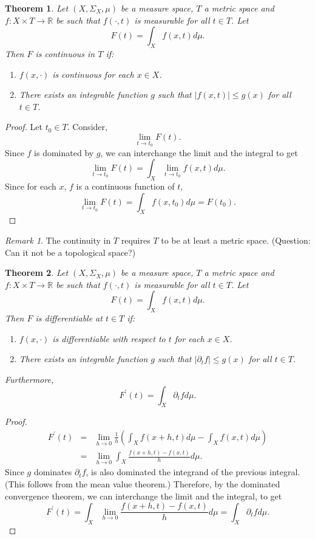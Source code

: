 \documentclass{article}
\newcommand{\sor}{\mathbb{R}}
\newcommand{\op}{\prime}
\theoremstyle{plain}
\newtheorem{thm}{Theorem}
\numberwithin{thm}{section}
\theoremstyle{plain}
\numberwithin{prop}{section}
\theoremstyle{definition}
\numberwithin{defn}{section}
\theoremstyle{remark}
\newtheorem*{rem}{Remark}
\theoremstyle{plain}
\numberwithin{cor}{section}
\numberwithin{equation}{section}
\begin{document}
\begin{thm}\label{c4t11} Let $(X, \Sigma_X, \mu)$ be a measure space, $T$ a 
metric space and $f:X \times T \rightarrow \sor$ be such that $f(\cdot, t)$ is
measurable for all $t \in T$. Let
\[
F(t) = \int_X f(x, t)d\mu.
\]
Then $F$ is continuous in $T$ if:
\begin{enumerate}
\item $f(x, \cdot)$ is continuous for each $x \in X$.
\item There exists an integrable function $g$ such that $|f(x, t)| \le g(x)$ 
for all $t \in T$.
\end{enumerate}
\end{thm}
\begin{proof}
Let $t_0 \in T$. Consider,
\[
\lim_{t \rightarrow t_0} F(t).
\]
Since $f$ is dominated by $g$, we can interchange the limit and the integral to
get
\[
\lim_{t \rightarrow t_0} F(t) = \int_X\lim_{t \rightarrow t_0}f(x, t)d\mu.
\]
Since for each $x$, $f$ is a continuous function of $t$,
\[
\lim_{t \rightarrow t_0} F(t) = \int_Xf(x, t_0)d\mu = F(t_0).
\]
\end{proof}

\begin{rem}
The continuity in $T$ requires $T$ to be at least a metric space. (Question: Can
it not be a topological space?)
\end{rem}

\begin{thm}\label{c4t12} Let $(X, \Sigma_X, \mu)$ be a measure space, $T$ a 
metric space and $f:X \times T \rightarrow \sor$ be such that $f(\cdot, t)$ is
measurable for all $t \in T$. Let
\[
F(t) = \int_X f(x, t)d\mu.
\]
Then $F$ is differentiable at $t \in T$ if:
\begin{enumerate}
\item $f(x, \cdot)$ is differentiable with respect to $t$ for each $x \in X$.
\item There exists an integrable function $g$ such that $|\partial_t f| \le g(x)$ 
for all $t \in T$.
\end{enumerate}
Furthermore,
\[
F^\op(t) = \int_X \partial_t f d\mu.
\]
\end{thm}
\begin{proof}
\begin{eqnarray*}
F^\op(t) &=& \lim_{h \rightarrow 0}\frac{1}{h}\left(\int_X f(x+h, t)d\mu -
\int_X f(x, t)d\mu\right) \\
&=& \lim_{h \rightarrow 0}\int_X \frac{f(x+h, t) - f(x, t)}{h} d\mu.
\end{eqnarray*}
Since $g$ dominates $\partial_t f$, is also dominated the integrand of the 
previous integral. (This follows from the mean value theorem.) Therefore, by the
dominated convergence theorem, we can interchange the limit and the integral, to
get
\[
F^\op(t) = \int_X\lim_{h \rightarrow 0}\frac{f(x+h, t) - f(x, t)}{h} d\mu = 
\int_X \partial_t f d\mu.
\]
\end{proof}
\end{document}
